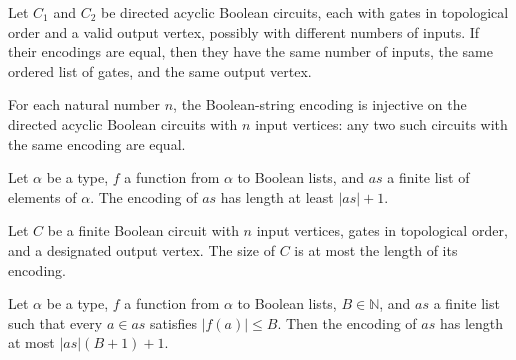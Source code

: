 \begin{theorem}
\label{BoolCircuit.DAGCircuit.eq_of_encode_eq}
\leanok
{}
Let $C_1$ and $C_2$ be directed acyclic Boolean circuits, each with gates in topological
order and a valid output vertex, possibly with different numbers of inputs. If their
encodings are equal, then they have the same number of inputs, the same ordered list of
gates, and the same output vertex.
\end{theorem}

\begin{theorem}
\label{BoolCircuit.DAGCircuit.encode_injective}
\leanok
{}
For each natural number $n$, the Boolean-string encoding is injective on the directed
acyclic Boolean circuits with $n$ input vertices: any two such circuits with the same
encoding are equal.
\end{theorem}

\begin{lemma}
\label{BoolCircuit.length_encodeList_ge}
\leanok
{}
Let $\alpha$ be a type, $f$ a function from $\alpha$ to Boolean lists, and $as$ a finite
list of elements of $\alpha$. The encoding of $as$ has length at least $|as|+1$.
\end{lemma}

\begin{theorem}
\label{BoolCircuit.DAGCircuit.size_le_length_encode}
\leanok
{}
Let $C$ be a finite Boolean circuit with $n$ input vertices, gates in topological order,
and a designated output vertex. The size of $C$ is at most the length of its encoding.
\end{theorem}

\begin{lemma}
\label{BoolCircuit.length_encodeList_le}
\leanok
{}
Let $\alpha$ be a type, $f$ a function from $\alpha$ to Boolean lists, $B\in\mathbb{N}$,
and $as$ a finite list such that every $a\in as$ satisfies $|f(a)|\le B$. Then the
encoding of $as$ has length at most $|as|(B+1)+1$.
\end{lemma}

